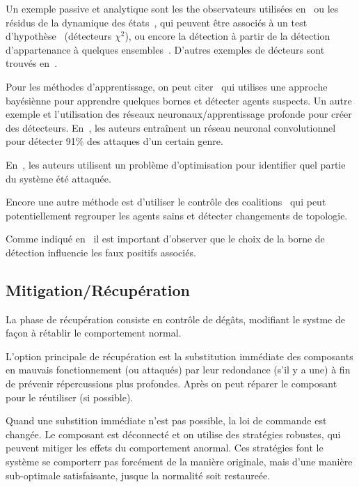 \documentclass[../main.tex]{subfiles}
\begin{document}
Un exemple passive et analytique sont les the observateurs utilisées en~\cite{HoehnZhang2016} ou les résidus de la dynamique des états~\cite{TeixeiraEtAl2015,BoemEtAl2020}, qui peuvent être associés à un test d'hypothèse~\cite{MoSinopoli2009} (détecteurs $\chi^{2}$), ou encore la détection à partir de la détection d'appartenance à quelques ensembles~\cite{FortiEtAl2016,MaestreEtAl2018}.
D'autres exemples de décteurs sont trouvés en~\cite{PasqualettiEtAl2012,PasqualettiEtAl2013,ZhangEtAl2021a,ArauzEtAl2021}.

Pour les méthodes d'apprentissage, on peut citer~\cite{AnandutaEtAl2018,AnandutaEtAl2019,AnandutaEtAl2020} qui utilises une approche bayésiènne pour apprendre quelques bornes et détecter agents suspects.
Un autre exemple et l'utilisation des réseaux neuronaux/apprentissage profonde
pour créer des détecteurs.
En~\cite{HussainEtAl2021}, les auteurs entraînent un réseau neuronal convolutionnel pour détecter 91\% des attaques \dDoS{} d'un certain genre.

En~\cite{BraunEtAl2020,BraunEtAl2020a}, les auteurs utilisent un problème d'optimisation pour identifier quel partie du système été attaquée.

Encore une autre méthode est d'utiliser le contrôle des coalitions~\cite{ChanfreutEtAl2021} qui peut potentiellement regrouper les agents sains et détecter changements de topologie.

\begin{remark}\label{rem:bounds_and_error_fr}
Comme indiqué en~\cite{ArauzEtAl2021} il est important d'observer que le choix de la borne de détection influencie les faux positifs associés.
\end{remark}

\subsection{Mitigation/Récupération}
La phase de récupération consiste en contrôle de dégâts, modifiant le systme de façon à rétablir le comportement normal.

L'option principale de récupération est la substitution immédiate des composants en mauvais fonctionnement (ou attaqués) par leur redondance (s'il y a une) à fin de prévenir répercussions plus profondes.
Après on peut réparer le composant pour le réutiliser (si possible).

Quand une substition immédiate n'est pas possible, la loi de commande est changée.
Le composant est déconnecté et on utilise des stratégies robustes, qui peuvent mitiger les effets du comportement anormal.
Ces stratégies font le système se comporterr pas forcément de la manière originale, mais d'une manière sub-optimale satisfaisante, jusque la normalité soit restaureée.
\end{document}
